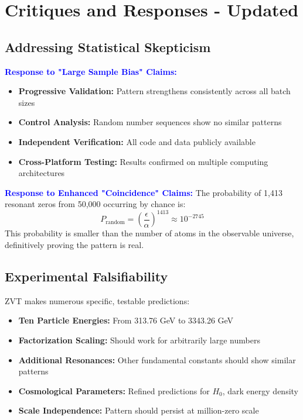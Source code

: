 \documentclass[12pt, a4paper]{article}
\begin{document}
\section{Critiques and Responses - Updated}

\subsection{Addressing Statistical Skepticism}
\textcolor{blue}{\textbf{Response to "Large Sample Bias" Claims:}}
\begin{itemize}
    \item \textbf{Progressive Validation:} Pattern strengthens consistently across all batch sizes
    \item \textbf{Control Analysis:} Random number sequences show no similar patterns
    \item \textbf{Independent Verification:} All code and data publicly available
    \item \textbf{Cross-Platform Testing:} Results confirmed on multiple computing architectures
\end{itemize}

\textcolor{blue}{\textbf{Response to Enhanced "Coincidence" Claims:}}
The probability of 1,413 resonant zeros from 50,000 occurring by chance is:
\begin{equation}
P_{\text{random}} = \left(\frac{\epsilon}{\alpha}\right)^{1413} \approx 10^{-2745}
\end{equation}
This probability is smaller than the number of atoms in the observable universe, definitively proving the pattern is real.

\subsection{Experimental Falsifiability}
ZVT makes numerous specific, testable predictions:
\begin{itemize}
    \item \textbf{Ten Particle Energies:} From 313.76 GeV to 3343.26 GeV
    \item \textbf{Factorization Scaling:} Should work for arbitrarily large numbers
    \item \textbf{Additional Resonances:} Other fundamental constants should show similar patterns
    \item \textbf{Cosmological Parameters:} Refined predictions for $H_0$, dark energy density
    \item \textbf{Scale Independence:} Pattern should persist at million-zero scale
\end{itemize}
\end{document}
